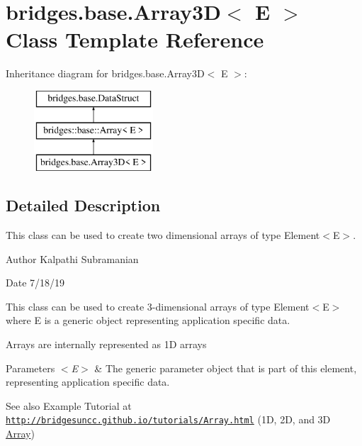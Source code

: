 \hypertarget{classbridges_1_1base_1_1_array3_d}{}\section{bridges.\+base.\+Array3D$<$ E $>$ Class Template Reference}
\label{classbridges_1_1base_1_1_array3_d}
Inheritance diagram for bridges.\+base.\+Array3D$<$ E $>$\+:\begin{figure}[H]
\begin{center}
\leavevmode
\includegraphics[height=3.000000cm]{classbridges_1_1base_1_1_array3_d}
\end{center}
\end{figure}


\subsection{Detailed Description}
This class can be used to create two dimensional arrays of type Element$<$\+E$>$. 

\begin{DoxyAuthor}{Author}
Kalpathi Subramanian
\end{DoxyAuthor}
\begin{DoxyDate}{Date}
7/18/19
\end{DoxyDate}
This class can be used to create 3-\/dimensional arrays of type Element$<$\+E$>$ where E is a generic object representing application specific data.

Arrays are internally represented as 1D arrays


\begin{DoxyParams}{Parameters}
{\em $<$\+E$>$} & The generic parameter object that is part of this element, representing application specific data.\\
\hline
\end{DoxyParams}
\begin{DoxySeeAlso}{See also}
Example Tutorial at ~\newline
 \href{http://bridgesuncc.github.io/tutorials/Array.html}{\tt http\+://bridgesuncc.\+github.\+io/tutorials/\+Array.\+html} (1D, 2D, and 3D \hyperlink{classbridges_1_1base_1_1_array}{Array})~\newline
 
\end{DoxySeeAlso}
